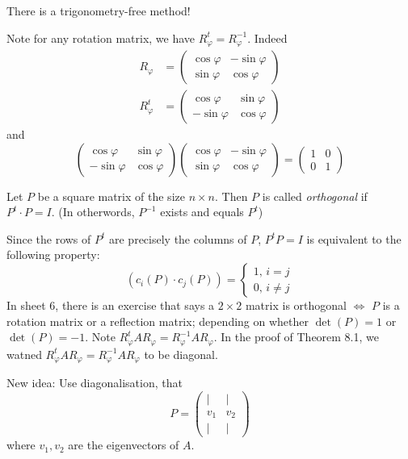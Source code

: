 \documentclass[10pt]{scrartcl}
\begin{document}

There is a trigonometry-free method!

Note for any rotation matrix, we have $R_\varphi^t = R_\varphi^{-1}$. Indeed 
\begin{align*}
  R_\varphi &= \begin{pmatrix}
 \cos\varphi & -\sin\varphi\\
 \sin\varphi & \cos\varphi 	
 \end{pmatrix}
\end{align*}
\begin{align*}
  R_\varphi^t &= \begin{pmatrix}
 \cos\varphi & \sin\varphi\\
 -\sin\varphi & \cos\varphi 	
 \end{pmatrix}
\end{align*}
and 
\[
  \begin{pmatrix}
  \cos\varphi & \sin\varphi\\
  -\sin\varphi & \cos\varphi 	
  \end{pmatrix}\begin{pmatrix}
\cos\varphi & -\sin\varphi \\
\sin\varphi & \cos\varphi 	
\end{pmatrix}= \begin{pmatrix}
 1 & 0 \\ 0 & 1	
 \end{pmatrix}
\]
\vsp

\begin{definition}
Let $P$ be a square matrix of the size $n \times n$. Then $P$ is called \emph{orthogonal} if $P^t\cdot P = I$. (In otherwords, $P^{-1}$ exists and equals $P^t$)	
\end{definition}

Since the rows of $P^t$ are precisely the columns of $P$, $P^tP = I$ is equivalent to the following property:
\[
  (c_i(P)\cdot c_j(P)) = \begin{cases}
 1,\, i = j\\
 0,\, i\neq j	
 \end{cases}
\]
In sheet 6, there is an exercise that says a $2\times 2$ matrix is orthogonal $\iff$ $P$ is a rotation matrix or a reflection matrix; depending on whether $\det(P) = 1$ or $\det(P) = -1$. Note  $R_\varphi^tAR_\varphi = R_\varphi^{-1}AR_\varphi$. In the proof of Theorem 8.1, we watned $R_\varphi^tAR_\varphi = R_\varphi^{-1}AR_\varphi$ to be diagonal. 

New idea: Use diagonalisation, that 
\[
  P = \begin{pmatrix}
 | & | \\
 v_1 & v_2\\ 
 | & |	
 \end{pmatrix}
\]
where $v_1,v_2$ are the eigenvectors of $A$.
\end{document}
